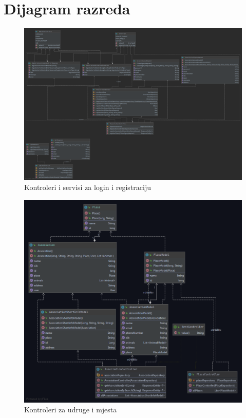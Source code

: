 			
		\section{Dijagram razreda}
		
			\begin{figure}[H]
				\includegraphics[width=\linewidth]{slike/Controllers-Services-Login-Registration.png}
				\centering
				\caption{Kontroleri i servisi za login i registraciju}
				\label{fig:controllers-services-login-registration}
			\end{figure}
		
			\begin{figure}[H]
				\includegraphics[width=\linewidth]{slike/Controllers-General.png}
				\centering
				\caption{Kontroleri za udruge i mjesta}
				\label{fig:controllers-general}
			\end{figure}
		
